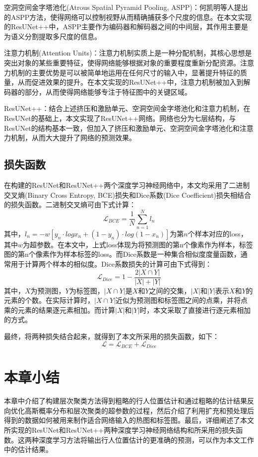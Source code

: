 空洞空间金字塔池化(Atrous Spatial Pyramid Pooling, ASPP)：何凯明等人\cite{2014Spatial}提出的ASPP方法，使得网络可以控制视野从而精确捕获多个尺度的信息。在本文实现的ResUNet++中，ASPP主要作为编码器和解码器之间的中间层，其作用主要是为语义分割提取多尺度的信息。

注意力机制(Attention Units)：注意力机制实质上是一种分配机制，其核心思想是突出对象的某些重要特征，使得网络能够根据对象的重要程度重新分配资源。注意力机制的主要优势是可以被简单地运用在任何尺寸的输入中，显著提升特征的质量，从而促进效果的提升。在本文实现的ResUNet++中，注意力机制被加入到解码器的部分，从而使得网络能够专注于特征图中的关键区域。

ResUNet++：结合上述挤压和激励单元、空洞空间金字塔池化和注意力机制，在ResUNet的基础上，本文实现了ResUNet++网络。网络也分为七层结构，与ResUNet的结构基本一致，但加入了挤压和激励单元、空洞空间金字塔池化和注意力机制，从而大大提升了网络的预测效果。

\subsection{损失函数}

在构建的ResUNet和ResUNet++两个深度学习神经网络中，本文均采用了二进制交叉熵(Binary Cross Entropy, BCE)损失和Dice系数(Dice Coefficient)损失相结合的损失函数。二进制交叉熵可由下式计算：
\begin{equation*}
  \mathcal{L}_{BCE} = \frac{1}{N}\sum_{n=1}^{N}l_{n}
\end{equation*}
其中，$l_n=-w[y_n \cdot log{x_n}+(1-y_n) \cdot log(1-x_n)]$为第$n$个样本对应的loss，其中$w$为超参数。在本文中，上式loss体现为将预测图的第n个像素作为样本，标签图的第n个像素作为样本标签的loss。而Dice系数是一种集合相似度度量函数，通常用于计算两个样本的相似度。Dice系数损失的计算可由下式得到：
\begin{equation*}
  \mathcal{L}_{Dice} = 1-\frac{2|X \cap Y|}{|X|+|Y|}
\end{equation*}
其中，$X$为预测图，$Y$为标签图，$|X \cap Y|$是$X$和$Y$之间的交集，$|X|$和$|Y|$表示$X$和$Y$的元素的个数。在实际计算时，$|X \cap Y|$近似为预测图和标签图之间的点乘，并将点乘的元素的结果逐元素相加。而计算$|X|$和$|Y|$时，本文采取了直接进行逐元素相加的方式。

最终，将两种损失结合起来，就得到了本文所采用的损失函数，如下：
\begin{equation*}
  \mathcal{L} = \mathcal{L}_{BCE} + \mathcal{L}_{Dice}
\end{equation*}

\section{本章小结}

本章中介绍了构建层次聚类方法得到粗略的行人位置估计和通过粗略的估计结果反向优化高斯概率分布和层次聚类的超参数的过程，然后介绍了利用扩充和预处理后得到的数据如何被用来制作适合网络输入的热图和标签图。最后，详细阐述了本文所实现的ResUNet和ResUNet++两种深度学习神经网络结构和所采用的损失函数。这两种深度学习方法将输出行人位置估计的更准确的预测，可以作为本文工作中的估计结果。